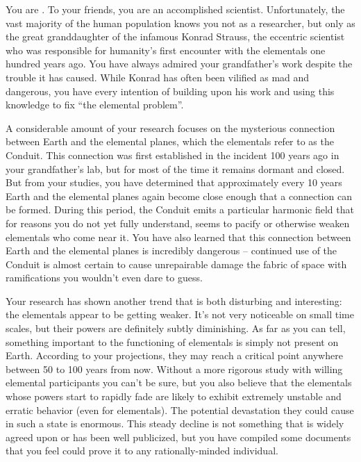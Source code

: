 \documentclass[char]{elementals}
\begin{document}
\name{\cGD{}}

You are \cGD{\intro}. To your friends, you are an accomplished scientist. Unfortunately, the vast majority of the human population knows you not as a researcher, but only as the great granddaughter of the infamous Konrad Strauss, the eccentric scientist who was responsible for humanity's first encounter with the elementals one hundred years ago. You have always admired your grandfather's work despite the trouble it has caused. While Konrad has often been vilified as mad and dangerous, you have every intention of building upon his work and using this knowledge to fix ``the elemental problem''.


A considerable amount of your research focuses on the mysterious connection between Earth and the elemental planes, which the elementals refer to as the Conduit. This connection was first established in the incident 100 years ago in your grandfather's lab, but for most of the time it remains dormant and closed. But from your studies, you have determined that approximately every 10 years Earth and the elemental planes again become close enough that a connection can be formed. During this period, the Conduit emits a particular harmonic field that for reasons you do not yet fully understand, seems to pacify or otherwise weaken elementals who come near it. You have also learned that this connection between Earth and the elemental planes is incredibly dangerous -- continued use of the Conduit is almost certain to cause unrepairable damage the fabric of space with ramifications you wouldn't even dare to guess.

Your research has shown another trend that is both disturbing and interesting: the elementals appear to be getting weaker. It's not very noticeable on small time scales, but their powers are definitely subtly diminishing. As far as you can tell, something important to the functioning of elementals is simply not present on Earth. According to your projections, they may reach a critical point anywhere between 50 to 100 years from now. Without a more rigorous study with willing elemental participants you can't be sure, but you also believe that the elementals whose powers start to rapidly fade are likely to exhibit extremely unstable and erratic behavior (even for elementals). The potential devastation they could cause in such a state is enormous. This steady decline is not something that is widely agreed upon or has been well publicized, but you have compiled some documents that you feel could prove it to any rationally-minded individual.
\end{document}
